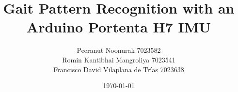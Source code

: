 \usepackage[utf8]{inputenc} %
\usepackage[english]{babel}
\usepackage{amsmath}
\usepackage{amsfonts}
\usepackage{amssymb}
\usepackage{colortbl}
\usepackage{cancel} %

\usepackage{pgfpages}


\usepackage{tikz}
\usepackage{gnuplottex}
\usepackage{pgf}
\usepackage{colortbl} 
\usetikzlibrary{calc}
\usetikzlibrary{shapes,arrows} %
\usetikzlibrary{shapes.geometric} %
\usepackage{scalefnt}
\usetikzlibrary{decorations.markings} %
\usetikzlibrary{calc,patterns,decorations.pathmorphing,decorations.markings}
\title{Gait Pattern Recognition with an Arduino Portenta H7 IMU}
\author{Peeranut Noonurak 7023582 \\ Romin Kantibhai Mangroliya 7023541 \\ Francisco David Vilaplana de Trías 7023638}
\date{\today}
\usepackage{url}

